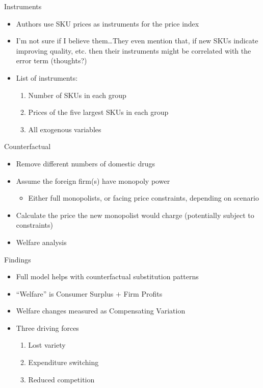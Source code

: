 \documentclass{beamer}
\begin{document}
\begin{frame}{Instruments}
  \begin{itemize}
  \item Authors use SKU prices as instruments for the price index
    \vfill
  \item I'm not sure if I believe them\ldots They even mention that, if new SKUs indicate improving quality, etc. then their instruments might be correlated with the error term (thoughts?)
    \vfill
  \item List of instruments:
    \begin{enumerate}
    \item Number of SKUs in each group
    \item Prices of the five largest SKUs in each group
      \item All exogenous variables
    \end{enumerate}
  \end{itemize}
\end{frame}
%
\begin{frame}{Counterfactual}
  \begin{itemize}
  \item Remove different numbers of domestic drugs
    \vfill
  \item Assume the foreign firm(s) have monopoly power
    \begin{itemize}
    \item Either full monopolists, or facing price constraints, depending on scenario
    \end{itemize}
    \vfill
  \item Calculate the price the new monopolist would charge (potentially subject to constraints)
    \vfill
    \item Welfare analysis
  \end{itemize}
\end{frame}
%
\begin{frame}{Findings}
  \begin{itemize}
  \item Full model helps with counterfactual substitution patterns
    \vfill
  \item ``Welfare'' is Consumer Surplus $+$ Firm Profits
    \vfill
  \item Welfare changes measured as Compensating Variation
    \vfill
  \item Three driving forces
    \begin{enumerate}
    \item Lost variety
    \item Expenditure switching
      \item Reduced competition
    \end{enumerate}
  \end{itemize}
\end{frame}
\end{document}
